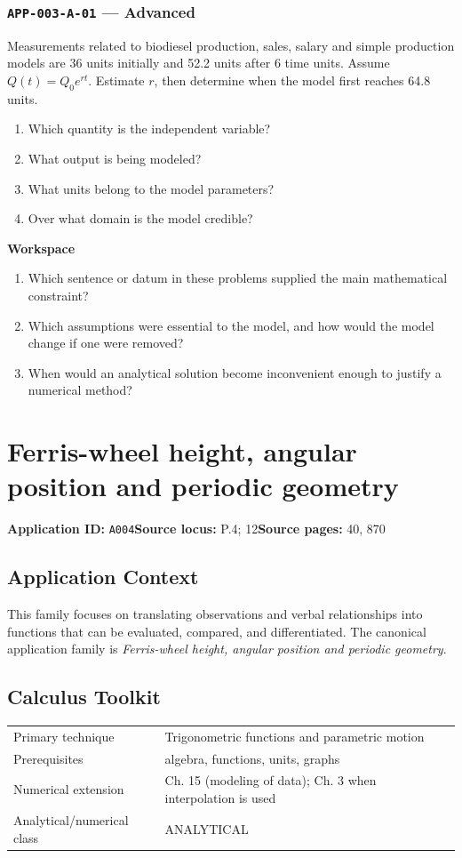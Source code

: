 \documentclass[11pt]{book}
\newcommand{\pid}[1]{\texttt{#1}}
\newcommand{\workspace}{\par\vspace{0.7in}\hrulefill\par\vspace{0.55in}\hrulefill\par}
\begin{document}
\subsection*{\pid{APP-003-A-01} — Advanced}
\begin{problembox}
Measurements related to biodiesel production, sales, salary and simple production models are 36 units initially and 52.2 units after 6 time units. Assume $Q(t)=Q_0e^{rt}$. Estimate $r$, then determine when the model first reaches 64.8 units.
\end{problembox}
\begin{promptbox}\begin{enumerate}
\item Which quantity is the independent variable?
\item What output is being modeled?
\item What units belong to the model parameters?
\item Over what domain is the model credible?
\end{enumerate}\end{promptbox}
\textbf{Workspace}\workspace
\begin{reflectionbox}\begin{enumerate}
\item Which sentence or datum in these problems supplied the main mathematical constraint?
\item Which assumptions were essential to the model, and how would the model change if one were removed?
\item When would an analytical solution become inconvenient enough to justify a numerical method?
\end{enumerate}\end{reflectionbox}
\chapter{Ferris-wheel height, angular position and periodic geometry}\label{app:A004}
\textbf{Application ID:} \pid{A004}\quad \textbf{Source locus:} P.4; 12\quad \textbf{Source pages:} 40, 870
\section*{Application Context}
This family focuses on translating observations and verbal relationships into functions that can be evaluated, compared, and differentiated. The canonical application family is \emph{Ferris-wheel height, angular position and periodic geometry}.
\section*{Calculus Toolkit}
\begin{tabularx}{\textwidth}{@{}lX@{}}\toprule
Primary technique & Trigonometric functions and parametric motion \\
Prerequisites & algebra, functions, units, graphs \\
Numerical extension & Ch. 15 (modeling of data); Ch. 3 when interpolation is used \\
Analytical/numerical class & ANALYTICAL \\
\bottomrule\end{tabularx}
\end{document}
